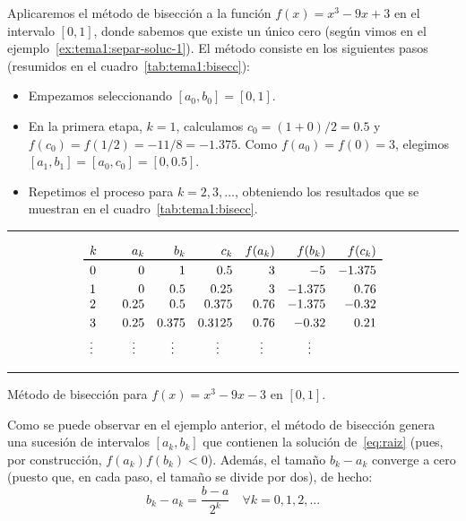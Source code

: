 \begin{example}
  Aplicaremos el método de bisección a la función $f(x)=x^3-9x+3$ en el intervalo
  $[0,1]$, donde sabemos que existe un único cero (según vimos en el
  ejemplo~\ref{ex:tema1:separ-soluc-1}). El método consiste en los
  siguientes pasos (resumidos en el cuadro~\ref{tab:tema1:bisecc}):

  \begin{itemize}
  \item Empezamos seleccionando $[a_0,b_0]=[0,1]$.
  \item En la primera etapa, $k=1$, calculamos
    $c_0=(1+0)/2=0.5$  y
    $f(c_0)=f(1/2)=-11/8=-1.375$. Como $f(a_0)=f(0)=3$, elegimos
    $[a_1,b_1]=[a_0,c_0]=[0,0.5]$.
  \item Repetimos el proceso para $k=2,3,...$, obteniendo los resultados que se
    muestran en el cuadro~\ref{tab:tema1:bisecc}.
  \end{itemize}

\end{example}
\begin{table}
  \centering
  \rule{0.99\linewidth}{1.6pt}
  \begin{equation*}
    \begin{array}{l<{\quad}rrrrrr}%
      k &  a_k & b_k & c_k & f(a_k) & f(b_k) & f(c_k)
      \\ \toprule%
      0 & 0 &1  &  0.5 & 3 & -5 & -1.375
      \\ \noalign{\smallskip}
      1 &  0& 0.5 &  0.25 & 3 & -1.375 & 0.76
      \\ \smallskip
      2 & 0.25 & 0.5 & 0.375 & 0.76 & -1.375 & -0.32
      \\ \smallskip
      3& 0.25 & 0.375 & 0.3125 & 0.76 & -0.32 & 0.21
      \\
      \hfill \vdots \hfill~ & \hfill \vdots \hfill~ &
                                                      \hfill \vdots \hfill~ & \hfill \vdots \hfill~ &
                                                                                                      \hfill \vdots \hfill~ & \hfill \vdots \hfill~
    \end{array}
  \end{equation*}
  \rule{0.99\linewidth}{1.5pt}
  \caption{Método de bisección para $f(x)=x^3-9x-3$ en $[0,1]$.}
  \label{tab:tema1:bisecc}
\end{table}

Como se puede observar en el ejemplo anterior, el método de bisección
genera una sucesión de intervalos $[a_k,b_k]$ que
contienen la solución de~\eqref{eq:raiz} (pues, por construcción,
$f(a_k)f(b_k)<0$). Además, el tamaño $b_k-a_k$ converge a cero (puesto
que, en cada paso, el tamaño se divide por dos), de hecho:
\begin{equation}
  \label{eq:tema1:bisec:1}
  b_k-a_k = \frac{b-a}{2^k} \quad \forall k=0,1,2,...
\end{equation}

